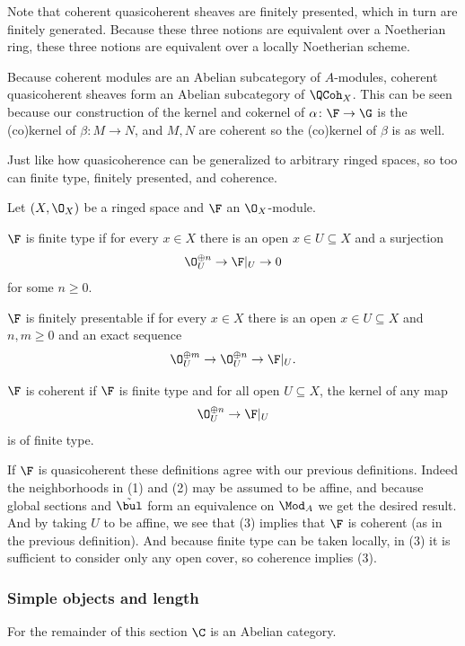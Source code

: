 Note that coherent quasicoherent sheaves are finitely presented, which in turn are finitely generated.
Because these three notions are equivalent over a Noetherian ring, these three notions are equivalent over a locally Noetherian scheme.

Because coherent modules are an Abelian subcategory of $A$-modules, coherent quasicoherent sheaves form an Abelian subcategory of $\QCoh_X$.
This can be seen because our construction of the kernel and cokernel of $\alpha\colon\F\to\G$ is the (co)kernel of $\beta\colon M\to N$, and $M,N$ are coherent so the (co)kernel
of $\beta$ is as well.

Just like how quasicoherence can be generalized to arbitrary ringed spaces, so too can finite type, finitely presented, and coherence.

\bdefn

    Let $(X,\O_X)$ be a ringed space and $\F$ an $\O_X$-module.
    \benum
        \item $\F$ is {\emphcolor finite type} if for every $x\in X$ there is an open $x\in U\subseteq X$ and a surjection
        $$ \O_U^{\oplus n} \to \F|_U \to 0 $$
        for some $n\geq0$.
        \item $\F$ is {\emphcolor finitely presentable} if for every $x\in X$ there is an open $x\in U\subseteq X$ and $n,m\geq0$ and an exact sequence
        $$ \O_U^{\oplus m} \to \O_U^{\oplus n} \to \F|_U . $$
        \item $\F$ is {\emphcolor coherent} if $\F$ is finite type and for all open $U\subseteq X$, the kernel of any map
        $$ \O_U^{\oplus n} \to \F|_U $$
        is of finite type.
    \eenum

\edefn

If $\F$ is quasicoherent these definitions agree with our previous definitions.
Indeed the neighborhoods in (1) and (2) may be assumed to be affine, and because global sections and $\tilde\bul$ form an equivalence on $\Mod_A$ we get the desired result.
And by taking $U$ to be affine, we see that (3) implies that $\F$ is coherent (as in the previous definition).
And because finite type can be taken locally, in (3) it is sufficient to consider only any open cover, so coherence implies (3).

\subsubsection{Simple objects and length}

For the remainder of this section $\C$ is an Abelian category.

